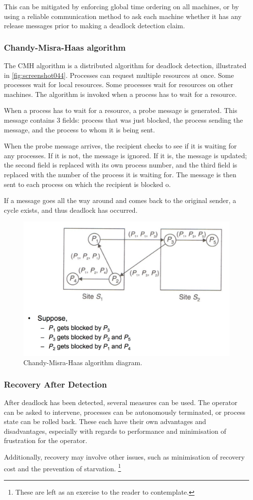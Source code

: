 This can be mitigated by enforcing global time ordering on all machines, or by using a reliable communication method to ask each machine whether it has any release messages prior to making a deadlock detection claim.

\subsubsection{Chandy-Misra-Haas algorithm}
The CMH algorithm is a distributed algorithm for deadlock detection, illustrated in \autoref{fig:screenshot044}. Processes can request multiple resources at once. Some processes wait for local resources. Some processes wait for resources on other machines. The algorithm is invoked when a process has to wait for a resource.

When a process has to wait for a resource, a probe message is generated. This message contains 3 fields: process that was just blocked, the process sending the message, and the process to whom it is being sent.

When the probe message arrives, the recipient checks to see if it is waiting for any processes. If it is not, the message is ignored. If it is, the message is updated; the second field is replaced with its own process number, and the third field is replaced with the number of the process it is waiting for. The message is then sent to each process on which the recipient is blocked o.

If a message goes all the way around and comes back to the original sender, a cycle exists, and thus deadlock has occurred.

\begin{figure}[h]
\centering
\includegraphics[width=0.5\linewidth]{screenshot044}
\caption{Chandy-Misra-Haas algorithm diagram.}
\label{fig:screenshot044}
\end{figure}

\subsubsection{Recovery After Detection}
After deadlock has been detected, several measures can be used. The operator can be asked to intervene, processes can be autonomously terminated, or process state can be rolled back. These each have their own advantages and disadvantages, especially with regards to performance and minimisation of frustration for the operator.

Additionally, recovery may involve other issues, such as minimisation of recovery cost and the prevention of starvation. \footnote{These are left as an exercise to the reader to contemplate.}
